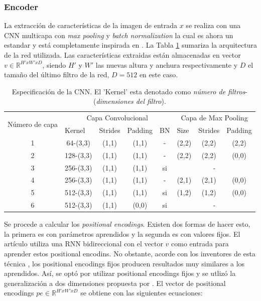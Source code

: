\subsubsection{Encoder}

La extracción de características de la imagen de entrada $x$ se realiza con una CNN multicapa con \textit{max pooling} y \textit{batch normalization} la cual es ahora un estandar y está completamente inspirada en \cite{harvard}. La Tabla \ref{tbl:cnn-model} sumariza la arquitectura de la red utilizada. Las características extraidas están almacenadas en vector $v \in \mathbb{R} ^ {H' x W' x D}$, siendo $H'$ y $W'$ las nuevas altura y anchura respectivamente y $D$ el tamaño del último filtro de la red, $D = 512$ en este caso.

\begin{table}[]
\centering
\begin{tabular}{@{}|c|c|c|c|c|c|c|c|@{}}
\toprule
\multirow{2}{*}{Número de capa} & \multicolumn{4}{c|}{Capa Convolucional} & \multicolumn{3}{c|}{Capa de Max Pooling} \\ \cmidrule(l){2-8} 
 & \multicolumn{1}{l|}{Kernel} & \multicolumn{1}{l|}{Strides} & \multicolumn{1}{l|}{Padding} & \multicolumn{1}{l|}{BN} & \multicolumn{1}{l|}{Size} & \multicolumn{1}{l|}{Strides} & \multicolumn{1}{l|}{Padding} \\ \midrule
1 & 64-(3,3) & (1,1) & (1,1) & - & (2,2) & (2,2) & (2,2) \\ \midrule
2 & 128-(3,3) & (1,1) & (1,1) & - & (2,2) & (2,2) & (0,0) \\ \midrule
3 & 256-(3,3) & (1,1) & (1,1) & si & \multicolumn{3}{c|}{-} \\ \midrule
4 & 256-(3,3) & (1,1) & (1,1) & - & (2,1) & (2,1) & (0,0) \\ \midrule
5 & 512-(3,3) & (1,1) & (1,1) & si & (1,2) & (1,2) & (0,0) \\ \midrule
6 & 512-(3,3) & (1,1) & (0,0) & si & \multicolumn{3}{c|}{-} \\ \bottomrule
\end{tabular}
\caption{Especificación de la CNN. El 'Kernel' esta denotado como \textit{número de filtros}-(\textit{dimensiones del filtro}).}
\label{tbl:cnn-model}
\end{table}

Se procede a calcular los \textit{positional encodings}. Existen dos formas de hacer esto, la primera es con parámetros aprendidos y la segunda es con valores fijos. El artículo \cite{harvard} utiliza una RNN bidireccional con el vector $v$ como entrada para aprender estos positional encodins. No obstante, acorde con los inventores de esta técnica \cite{attentionisallyouneed}, los positional encodings fijos producen resultados muy similares a los aprendidos. Así, se optó por utilizar positional encodings fijos y se utlizó la generalización a dos dimensiones propuesta por \cite{positionalencodings}. El vector de positional encodings $pe \in \mathbb{R} ^ {H'xW'xD}$ se obtiene con las siguientes ecuaciones:

